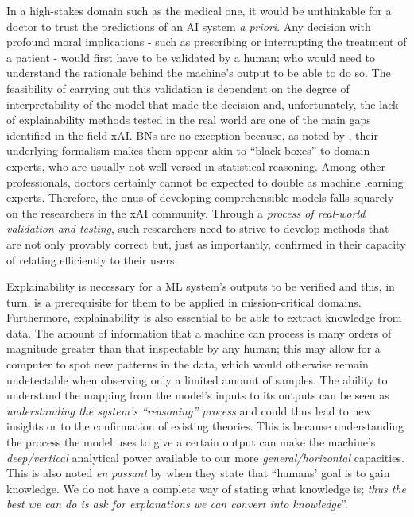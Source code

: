 In a high-stakes domain such as the medical one, it would be unthinkable for a doctor to trust the predictions of an AI system \textit{a priori}.
Any decision with profound moral implications - such as prescribing or interrupting the treatment of a patient - would first have to be validated by a human; who would need to understand the rationale behind the machine's output to be able to do so. 
The feasibility of carrying out this validation is dependent on the degree of interpretability of the model that made the decision and, unfortunately, the lack of explainability methods tested in the real world are one of the main gaps identified in the field xAI.
BNs are no exception because, as noted by \citet{timmer2015explaining}, their underlying formalism makes them appear akin to \enquote{black-boxes} to domain experts, who are usually not well-versed in statistical reasoning.
Among other professionals, doctors certainly cannot be expected to double as machine learning experts. 
Therefore, the onus of developing comprehensible models falls squarely on the researchers in the xAI community.
Through a \textit{process of real-world validation and testing}, such researchers need to strive to develop methods that are not only provably correct but, just as importantly, confirmed in their capacity of relating efficiently to their users.

Explainability is necessary for a ML system's outputs to be verified and this, in turn, is a prerequisite for them to be applied in mission-critical domains.
Furthermore, explainability is also essential to be able to extract knowledge from data. 
The amount of information that a machine can process is many orders of magnitude greater than that inspectable by any human; this may allow for a computer to spot new patterns in the data, which would otherwise remain undetectable when observing only a limited amount of samples.   
The ability to understand the mapping from the model's inputs to its outputs can be seen as \textit{understanding the system's \enquote{reasoning} process} and could thus lead to new insights or to the confirmation of existing theories.
This is because understanding the process the model uses to give a certain output can make the machine's \textit{deep/vertical} analytical power available to our more \textit{general/horizontal} capacities.
This is also noted \textit{en passant} by \citet{doshi2017towards} when they state that \enquote{humans' goal is to gain knowledge. We do not have a complete way of stating what knowledge is; \textit{thus the best we can do is ask for explanations we can convert into knowledge}}.

